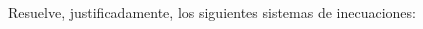 \documentclass[addpoints,spanish, 12pt,a4paper]{exam}
\renewcommand*\half{.5}
\begin{document}
\begin{questions}



        \question[3] Resuelve, justificadamente, los siguientes sistemas de inecuaciones:
        \begin{multicols}{2}
        \begin{parts} 

\end{parts}
\end{multicols}
\end{questions}
\end{document}
